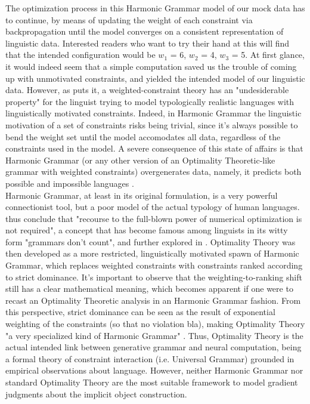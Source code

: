 The optimization process in this Harmonic Grammar model of our mock data has to continue, by means of updating the weight of each constraint via backpropagation until the model converges on a consistent representation of linguistic data. Interested readers who want to try their hand at this will find that the intended configuration would be $w_1$ = 6, $w_2$ = 4, $w_3$ = 5. At first glance, it would indeed seem that a simple computation saved us the trouble of coming up with unmotivated constraints, and yielded the intended model of our linguistic data. However, as \textcite{kuhn2002corpus} puts it, a weighted-constraint theory has an "undesiderable property" for the linguist trying to model typologically realistic languages with linguistically motivated constraints. Indeed, in Harmonic Grammar the linguistic motivation of a set of constraints risks being trivial, since it's always possible to bend the weight set until the model accomodates all data, regardless of the constraints used in the model. A severe consequence of this state of affairs is that Harmonic Grammar (or any other version of an Optimality Theoretic-like grammar with weighted constraints) overgenerates data, namely, it predicts both possible and impossible languages \parencite{legendre2006optimality, pater2009weighted}.\\
Harmonic Grammar, at least in its original formulation, is a very powerful connectionist tool, but a poor model of the actual typology of human languages. \textcite[216]{princesmolensky1993optimality} thus conclude that "recourse to the full-blown power of numerical optimization is not required", a concept that has become famous among linguists in its witty form "grammars don't count", and further explored in \textcite{smolensky2006harmony}. Optimality Theory was then developed as a more restricted, linguistically motivated spawn of Harmonic Grammar, which replaces weighted constraints with constraints ranked according to strict dominance. It's important to observe that the weighting-to-ranking shift still has a clear mathematical meaning, which becomes apparent if one were to recast an Optimality Theoretic analysis in an Harmonic Grammar fashion. From this perspective, strict dominance can be seen as the result of exponential weighting of the constraints (so that no violation bla), making Optimality Theory "a very specialized kind of Harmonic Grammar" \parencite{princesmolensky1993optimality, PrinceSmolensky2008}. Thus, Optimality Theory is the actual intended link between generative grammar and neural computation, being a formal theory of constraint interaction (i.e. Universal Grammar) grounded in empirical observations about language. However, neither Harmonic Grammar nor standard Optimality Theory are the most suitable framework to model gradient judgments about the implicit object construction.


